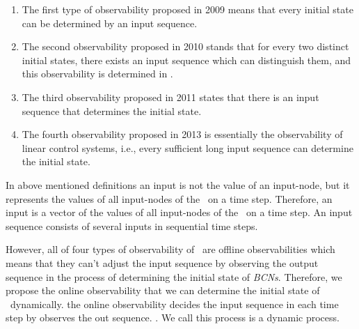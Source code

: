 \begin{enumerate}
	\item The first type of observability proposed in 2009 \cite{cheng2009controllability} means that every initial state can be determined by an input sequence.
	
	\item 
	The second observability proposed in 2010 \cite{Zhao2010Input} stands that for every two distinct initial states, there exists an input sequence which can distinguish them, and this observability is determined in \cite{Li2015Controllability}.
	
	\item The third observability proposed in 2011 \cite{Cheng2011Identification} states that there is an input sequence that determines the initial state.
	
	\item  The fourth observability proposed in 2013 \cite{Fornasini2013Observability} is essentially the observability of linear control systems, i.e., every sufficient long input sequence can determine the initial state.
\end{enumerate}
 



In above mentioned definitions an input is not the value of an input-node, but it represents the values of all input-nodes of the \BCN\ on a time step. Therefore, an input is a vector of the values of all input-nodes of the \BCN\ on a time step. An input sequence consists of several inputs in sequential time steps.
 
 However, all of four  types of observability of \BCNs\ are offline observabilities which means that they can't adjust the input sequence by observing the output sequence in the process of determining the initial state of {\em BCNs}. Therefore, we propose the online observability that we can determine the initial state of \BCNs\ dynamically.   the online observability decides the input sequence in each time step by observes the out sequence. . We call this process is a dynamic process. 

